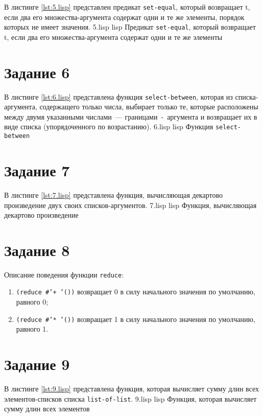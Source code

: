 В листинге \ref{lst:5.lisp} представлен предикат \texttt{set-equal}, который возвращает t, если два его множества-аргумента содержат одни и те же элементы, порядок которых не имеет значения.
	{5.lisp}
	{lisp}
	{Предикат \texttt{set-equal}, который возвращает t, если два его множества-аргумента содержат одни и те же элементы}

\section{Задание 6}

В листинге \ref{lst:6.lisp} представлена функция \texttt{select-between}, которая из списка-аргумента, содержащего только числа, выбирает только те, которые расположены между двумя указанными числами~--- границами~-~аргумента и возвращает их в виде списка (упорядоченного по возрастанию).
	{6.lisp}
	{lisp}
	{Функция \texttt{select-between}}

\section{Задание 7}

В листинге \ref{lst:7.lisp} представлена функция, вычисляющая декартово произведение двух своих списков-аргументов.
	{7.lisp}
	{lisp}
	{Функция, вычисляющая декартово произведение}

\section{Задание 8}

Описание поведения функции \texttt{reduce}:
\begin{enumerate}
	\item \texttt{(reduce \#'+ '())} возвращает 0 в силу начального значения по умолчанию, равного 0;
	\item \texttt{(reduce \#'* '())} возвращает 1 в силу начального значения по умолчанию, равного 1.
\end{enumerate}

\section{Задание 9}

В листинге \ref{lst:9.lisp} представлена функция, которая вычисляет сумму длин всех элементов-списков списка \texttt{list-of-list}.
	{9.lisp}
	{lisp}
	{Функция, которая вычисляет сумму длин всех элементов}
